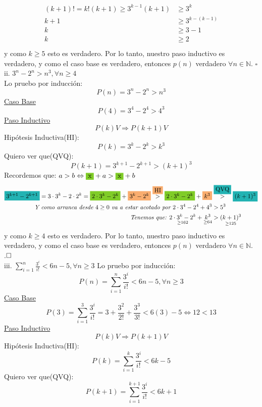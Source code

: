 \documentclass[a4paper,11pt]{article}
\begin{document}
\begin{align*}
\begin{split}
 (k+1)! = k!(k+1) \geq 3^{k-1}(k+1) & \geq 3^k  \\
 k+1 & \geq 3^{k-(k-1)} \\
 k & \geq 3 - 1 \\
 k & \geq 2\\
\end{split}
\end{align*}
y como $k \geq 5$ esto es verdadero. Por lo tanto, nuestro paso inductivo es verdadero, y como el caso base es verdadero, entonces $p(n)$ verdadero $\forall n \in \mathbb{N}$.
\hfill$\square$\\
ii. $3^n - 2^n > n^3, \forall n \geq 4$\\
Lo pruebo por inducción:\\
\[ P(n) = 3^n - 2^n > n^3 \]
\underline{Caso Base}\\
\[ P(4) = 3^4 - 2^4 > 4^3 \] 
\underline{Paso Inductivo}\\
\[P(k) V \Rightarrow P(k+1) V\]
Hipótesis Inductiva(HI):\[ P(k) = 3^k - 2^k > k^3 \]
Quiero ver que(QVQ):\[ P(k+1) = 3^{k+1} - 2^{k+1} > (k+1)^3 \]
Recordemos que: $ a>b \Leftrightarrow \colorbox{LimeGreen}{x} + a > \colorbox{LimeGreen}{x} + b  $\\
\begin{align*}
\begin{split}
\colorbox{TealBlue}{$3^{k+1} - 2^{k+1}$} = 3\cdot 3^{k} - 2\cdot 2^{k} = \colorbox{LimeGreen}{$2\cdot 3^{k} -  2^{k}$} + \colorbox{Apricot}{$3^k - 2^k$} \stackrel{\colorbox{Apricot}{HI}}{>} \colorbox{LimeGreen}{$2\cdot 3^{k} -  2^{k}$} + \colorbox{Apricot}{$k^3$} & \stackrel{\colorbox{TealBlue}{{QVQ}}}{>} \colorbox{TealBlue}{$(k+1)^3$} \\
 \textit{Y como arranca desde $4 \geq 0$ va a estar acotado por  } 2\cdot 3^4 - 2^4 + 4^3 & > 5^3\\
 \textit{Tenemos que: } \underset{\geq 162}{2\cdot 3^{k} -  2^{k}} + \underset{\geq 64}{k^3} & >\underset{\geq 125}{(k+1)^3}\\
\end{split}
\end{align*}
y como $k \geq 4$ esto es verdadero. Por lo tanto, nuestro paso inductivo es verdadero, y como el caso base es verdadero, entonces $p(n)$ verdadero $\forall n \in \mathbb{N}$.\\
.$\hfill \square$\\
iii. $\sum\limits_{i=1}^{n} \frac{3^i}{i!} < 6n-5, \forall n \geq 3 $
Lo pruebo por inducción:\\
\[ P(n) =  \sum\limits_{i=1}^{n} \frac{3^i}{i!} < 6n-5, \forall n \geq 3 \]
\underline{Caso Base}\\
\[ P(3) = \sum\limits_{i=1}^{3} \frac{3^i}{i!} = 3 + \frac{3^2}{2!} + \frac{3^3}{3!} < 6(3)-5 \Leftrightarrow 12 < 13 \] 
\underline{Paso Inductivo}\\
\[P(k) V \Rightarrow P(k+1) V\]
Hipótesis Inductiva(HI):\[ P(k) =  \sum\limits_{i=1}^{k} \frac{3^i}{i!} < 6k-5 \]
Quiero ver que(QVQ):\[ P(k+1) =  \sum\limits_{i=1}^{k+1} \frac{3^i}{i!} < 6k + 1\]
\end{document}
